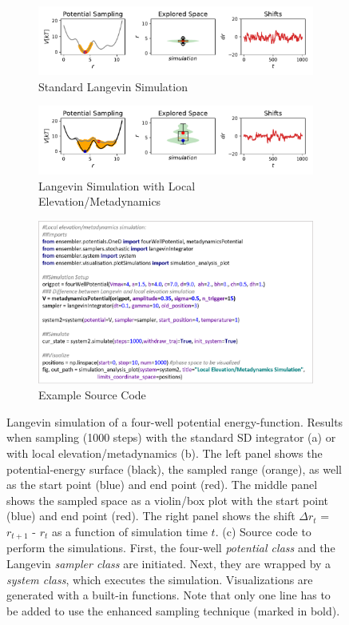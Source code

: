 \begin{figure}[H]
	\centering
	\begin{subfigure}{\textwidth}
		\caption{Standard Langevin Simulation}
		\centering
		\includegraphics[width=0.85\linewidth]{fig/codeExamples/langevin_simulation.pdf} 
	\end{subfigure}
	\vspace{2.5mm}
	\begin{subfigure}{\textwidth}
		\caption{Langevin Simulation with Local Elevation/Metadynamics}
		\centering
		\includegraphics[width=0.85\linewidth]{fig/codeExamples/metaDynamics_simulation.pdf}
	\end{subfigure}
	\vspace{2.5mm}
	\begin{subfigure}{\textwidth}
		\caption{Example Source Code}
		\centering
		\includegraphics[width=0.85\linewidth]{fig/codeExamples/Simulation_code.png}
	\end{subfigure}
\caption{Langevin simulation of a four-well potential energy-function. Results when sampling (1000 steps) with the standard SD integrator (a) or with local elevation\cite{Huber1994}/metadynamics\cite{Laio2002} (b). The left panel shows the potential-energy surface (black), the sampled range (orange), as well as the start point (blue) and end point (red). The middle panel shows the sampled space as a violin/box plot with the start point (blue) and end point (red). The right panel shows the shift $\Delta r_t$ = $r_{t+1}$ - $r_t$ as a function of simulation time $t$.
	(c) Source code to perform the simulations. First, the four-well \textit{potential class} and the Langevin \textit{sampler class} are initiated. Next, they are wrapped by a \textit{system class}, which executes the simulation. Visualizations are generated with a built-in functions. Note that only one line has to be added to use the enhanced sampling technique (marked in bold).}
\label{fig:code_example_simulations}
\end{figure}


